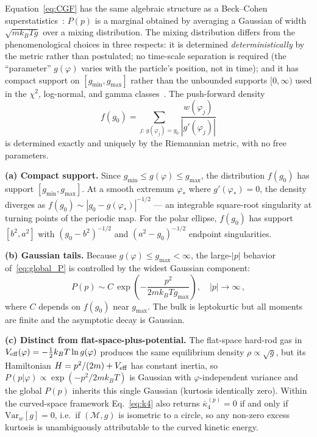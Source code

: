 \documentclass[aps,pre,twocolumn,superscriptaddress,longbibliography,floatfix]{revtex4-2}
\begin{document}
Equation~\eqref{eq:CGF} has the same algebraic structure as a Beck--Cohen
superstatistics~\cite{BeckCohen2003}: $P(p)$ is a marginal obtained by averaging a
Gaussian of width $\sqrt{mk_BTg}$ over a mixing distribution.
The mixing distribution differs from the phenomenological choices in three respects:
it is determined \emph{deterministically} by the metric rather than postulated; no
time-scale separation is required (the ``parameter'' $g(\varphi)$ varies with the
particle's position, not in time); and it has compact support on $[g_{\min},g_{\max}]$
rather than the unbounded supports $[0,\infty)$ used in the
$\chi^2$, log-normal, and gamma classes~\cite{BeckCohen2003}.
The push-forward density
\begin{equation}
  f(g_0) = \sum_{j:\,g(\varphi_j)=g_0}\frac{w(\varphi_j)}{|g'(\varphi_j)|}
  \label{eq:fg0}
\end{equation}
is determined exactly and uniquely by the Riemannian metric, with no free parameters.

\textbf{(a) Compact support.}
Since $g_{\min}\leq g(\varphi)\leq g_{\max}$, the distribution $f(g_0)$ has support
$[g_{\min},g_{\max}]$.
At a smooth extremum $\varphi_*$ where $g'(\varphi_*)=0$, the density diverges as
$f(g_0)\sim|g_0-g(\varphi_*)|^{-1/2}$ — an integrable square-root singularity at
turning points of the periodic map.
For the polar ellipse, $f(g_0)$ has support $[b^2,a^2]$ with $(g_0-b^2)^{-1/2}$ and
$(a^2-g_0)^{-1/2}$ endpoint singularities.

\textbf{(b) Gaussian tails.}
Because $g(\varphi)\leq g_{\max}<\infty$, the large-$|p|$ behavior of~\eqref{eq:global_P}
is controlled by the widest Gaussian component:
\begin{equation}
  P(p) \sim C\,\exp\!\left(-\frac{p^2}{2mk_BTg_{\max}}\right), \quad |p|\to\infty\,,
  \label{eq:gaussian_tails}
\end{equation}
where $C$ depends on $f(g_0)$ near $g_{\max}$.
The bulk is leptokurtic but all moments are finite and the asymptotic decay is Gaussian.

\textbf{(c) Distinct from flat-space-plus-potential.}
The flat-space hard-rod gas in $V_{\rm eff}(\varphi)=-\tfrac{1}{2}k_BT\ln g(\varphi)$ produces
the same equilibrium density $\rho\propto\sqrt{g}$, but its Hamiltonian
$H=p^2/(2m)+V_{\rm eff}$ has constant inertia, so $P(p|\varphi)\propto\exp(-p^2/2mk_BT)$ is
Gaussian with $\varphi$-independent variance and the global $P(p)$ inherits this single
Gaussian (kurtosis identically zero).
Within the curved-space framework Eq.~\eqref{eq:k4} also returns $\bar\kappa_4^{(p)}=0$ if
and only if $\mathrm{Var}_w[g]=0$, i.e.\ if $(\mathcal{M},g)$ is isometric to a circle, so
any non-zero excess kurtosis is unambiguously attributable to the curved kinetic energy.
\end{document}
